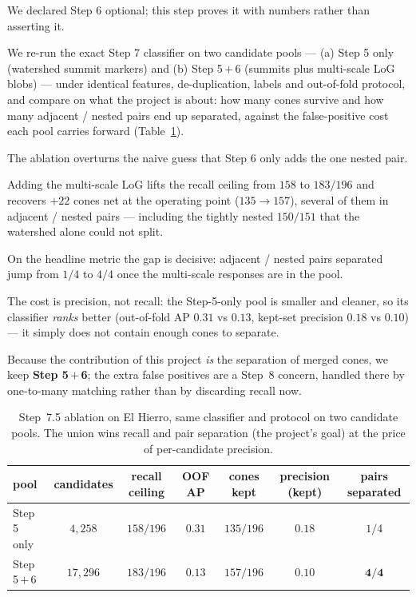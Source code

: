 \documentclass[11pt]{article}
\begin{document}
We declared Step 6 optional; this step proves it with numbers rather than asserting it.

We re-run the exact Step 7 classifier on two candidate pools --- (a) Step 5 only (watershed summit markers) and (b) Step 5\,$+$\,6 (summits plus multi-scale LoG blobs) --- under identical features, de-duplication, labels and out-of-fold protocol, and compare on what the project is about: how many cones survive and how many adjacent / nested pairs end up separated, against the false-positive cost each pool carries forward (Table~\ref{tab:abl}).

The ablation overturns the naive guess that Step 6 only adds the one nested pair.

Adding the multi-scale LoG lifts the recall ceiling from $158$ to $183/196$ and recovers $+22$ cones net at the operating point ($135 \to 157$), several of them in adjacent / nested pairs --- including the tightly nested $150/151$ that the watershed alone could not split.

On the headline metric the gap is decisive: adjacent / nested pairs separated jump from $1/4$ to $4/4$ once the multi-scale responses are in the pool.

The cost is precision, not recall: the Step-5-only pool is smaller and cleaner, so its classifier \emph{ranks} better (out-of-fold AP $0.31$ vs $0.13$, kept-set precision $0.18$ vs $0.10$) --- it simply does not contain enough cones to separate.

Because the contribution of this project \emph{is} the separation of merged cones, we keep \textbf{Step 5\,$+$\,6}; the extra false positives are a Step~8 concern, handled there by one-to-many matching rather than by discarding recall now.

\begin{table}[H]
\centering
\caption{Step~7.5 ablation on El Hierro, same classifier and protocol on two candidate pools.
The union wins recall and pair separation (the project's goal) at the price of per-candidate precision.}
\label{tab:abl}
\begin{tabular}{lcccccc}
\hline
pool & candidates & recall ceiling & OOF AP & cones kept & precision (kept) & pairs separated \\
\hline
Step 5 only & $4{,}258$  & $158/196$ & $0.31$ & $135/196$ & $0.18$ & $1/4$ \\
Step 5\,$+$\,6 & $17{,}296$ & $183/196$ & $0.13$ & $157/196$ & $0.10$ & $\mathbf{4/4}$ \\
\hline
\end{tabular}
\end{table}
\end{document}
